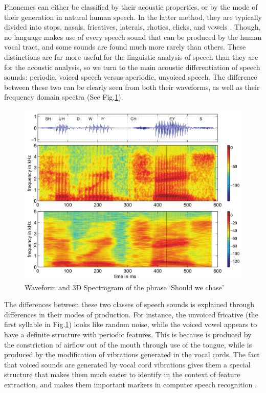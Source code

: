 \documentclass[titlepage]{article}
\begin{document}
    Phonemes can either be classified by their acoustic properties,
    or by the mode of their generation in natural human speech. In the latter
    method, they are typically divided into stops, nasals, fricatives, 
    laterals, rhotics,
    clicks, and vowels \cite{Ladefoged1996}. Though, no language makes use of 
    every speech sound
    that can be produced by the human vocal tract, and some sounds are found 
    much
    more rarely than others. These distinctions are far more useful for the 
    linguistic analysis
    of speech than they are for the acoustic analysis, so we turn to the main 
    acoustic
    differentiation of speech sounds: periodic, voiced speech versus aperiodic, 
    unvoiced speech.
    The difference between these two can be clearly seen from both their 
    waveforms, as well as
    their frequency domain spectra (See Fig.\ref{exampleSpectrogram}).


    \begin{figure}
      \centering
      \includegraphics[scale=0.23]{exampleSpectrogram}
      \caption{Waveform and 3D Spectrogram of the phrase `Should we chase' \cite{Rabiner2007}}
      \label{exampleSpectrogram}
    \end{figure}


    The differences between these two classes of speech sounds is explained
    through differences in their modes of production. For instance, the unvoiced
    fricative \textipa{[S]} (the first syllable in Fig.\ref{exampleSpectrogram})
    looks like random noise, while the voiced vowel \textipa{[U]} appears to have
    a definite structure with periodic features. This is because \textipa{[S]} is
    produced by the constriction of airflow out of the mouth through use of the tongue,
    while \textipa{[U]} is produced by the modification of vibrations generated in the
    vocal cords. The fact that voiced sounds are generated by vocal cord vibrations gives
    them a special structure that makes them much easier to identify in the context of
    feature extraction, and makes them important markers in computer speech recognition
    \cite{Gutierrez-Osuna2017}.
\end{document}
